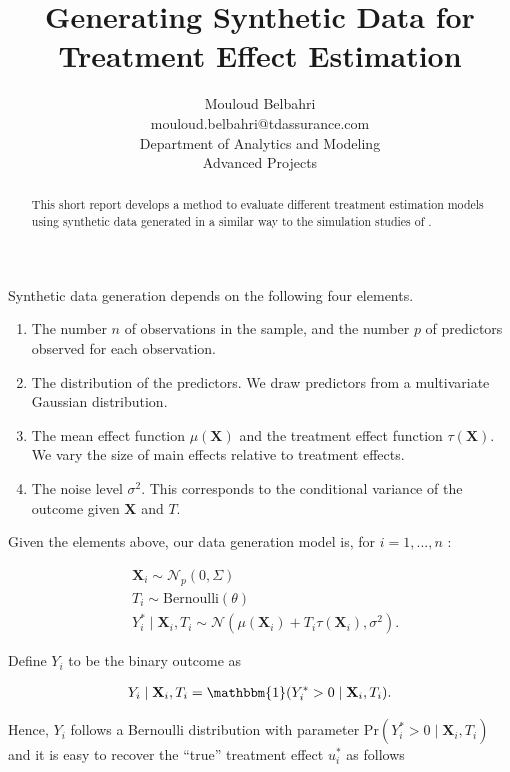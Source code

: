 \documentclass{article}
\title{Generating Synthetic Data for Treatment Effect Estimation}
\author{
  Mouloud Belbahri \\
  mouloud.belbahri@tdassurance.com \\
  Department of Analytics and Modeling\\
  Advanced Projects
}
\def\X{\mathbf X}
\begin{document}
\maketitle

\begin{abstract}
This short report develops a method to evaluate different treatment estimation models using synthetic data generated in a similar way to the simulation studies of \cite{tian2014simple}.
\end{abstract}




Synthetic data generation depends on the following four elements.

\begin{enumerate}
    \item The number $n$ of observations in the sample, and the number $p$ of predictors observed for each observation.
    \item The distribution of the predictors. We draw predictors from a multivariate Gaussian distribution.
    \item The mean effect function $\mu(\X)$ and the treatment effect function $\tau(\X)$. We vary the size of main effects relative to treatment effects.
    \item The noise level $\sigma^2$. This corresponds to the conditional variance of the outcome given $\X$ and $T$. 
\end{enumerate}

Given the elements above, our data generation model is, for $i=1,...,n$ :

\begin{align*}
    &\X_i \sim \mathcal{N}_p (0, \Sigma) \\
    &T_i \sim \mathrm{Bernoulli}(\theta)\\
    &Y_i^* \mid \X_i, T_i \sim \mathcal{N}(\mu(\X_i) + T_i\tau(\X_i), \sigma^2).
\end{align*}

Define $Y_i$ to be the binary outcome as

\begin{align*}
    Y_i \mid \X_i, T_i = \mathbbm{1}(Y_i^* > 0 \mid \X_i, T_i).
\end{align*}

Hence, $Y_i$ follows a Bernoulli distribution with parameter $\mathrm{Pr}(Y_i^* > 0 \mid \X_i, T_i)$ and it is easy to recover the ``true'' treatment effect $u_i^*$ as follows
\end{document}
